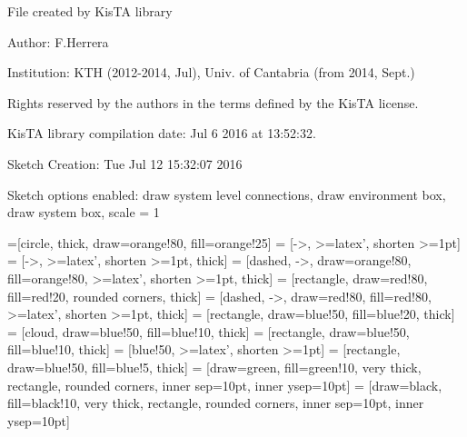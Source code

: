 \documentclass[a4paper,10pt]{article}
\begin{document}
File created by KisTA library

Author: F.Herrera

Institution: KTH (2012-2014, Jul), Univ. of Cantabria (from 2014, Sept.)

Rights reserved by the authors in the terms defined by the KisTA license.

KisTA library compilation date: Jul  6 2016 at 13:52:32.



Sketch Creation: Tue Jul 12 15:32:07 2016


Sketch options enabled:
draw system level connections, draw environment box, draw system box, scale = 1
\hfill


=[circle, thick, draw=orange!80, fill=orange!25]
 = [->, >=latex', shorten >=1pt]
 = [->, >=latex', shorten >=1pt, thick]
 = [dashed, ->, draw=orange!80, fill=orange!80, >=latex', shorten >=1pt, thick]
 = [rectangle, draw=red!80, fill=red!20, rounded corners, thick]
 = [dashed, ->, draw=red!80, fill=red!80, >=latex', shorten >=1pt, thick]
 = [rectangle, draw=blue!50, fill=blue!20, thick]
 = [cloud, draw=blue!50, fill=blue!10, thick]
 = [rectangle, draw=blue!50, fill=blue!10, thick]
 = [blue!50, >=latex', shorten >=1pt]
 = [rectangle, draw=blue!50,  fill=blue!5, thick]
 = [draw=green, fill=green!10, very thick, rectangle, rounded corners, inner sep=10pt, inner ysep=10pt]
 = [draw=black, fill=black!10, very thick, rectangle, rounded corners, inner sep=10pt, inner ysep=10pt]
\end{document}
